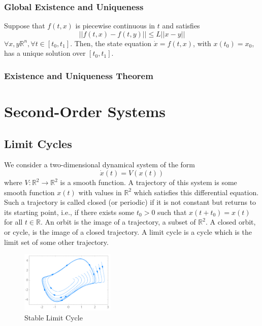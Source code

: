 \documentclass{article}
\begin{document}
\subsubsection{Global Existence and Uniqueness}
Suppose that $f(t,x)$ is piecewise continuous in $t$ and satisfies
\begin{equation*}
	||f(t,x)-f(t,y)|| \leq L||x-y||
\end{equation*}
$\forall x,y \mathbb{R}^n,\forall t \in [t_0,t_1]$. Then, the state equation $\dot x = f(t,x)$, with $x(t_0)=x_0$, has a unique solution over $[t_0,t_1]$.
\subsubsection{Existence and Uniqueness Theorem}
\newpage
\section{Second-Order Systems}
\subsection{Limit Cycles}
We consider a two-dimensional dynamical system of the form
\begin{equation*}
	\dot x(t) = V(x(t))
\end{equation*}
where $V: \mathbb{R}^2 \to \mathbb{R}^2$ is a smooth function. A trajectory of this system is some smooth function $x(t)$ with values in $\mathbb{R}^2$ which satisfies this differential equation. Such a trajectory is called closed (or periodic) if it is not constant but returns to its starting point, i.e., if there exists some $t_0 > 0$ such that $x(t + t_0) = x(t)$ for all $t \in \mathbb{R}$. An orbit is the image of a trajectory, a subset of $\mathbb{R}^2$. A closed orbit, or cycle, is the image of a closed trajectory. A limit cycle is a cycle which is the limit set of some other trajectory.
\begin{figure}[H]
	\centering
	\includegraphics[width = 0.4\textwidth]{figures/375px-VanDerPolPhaseSpace.png}
	\caption{Stable Limit Cycle}
\end{figure}
\end{document}

